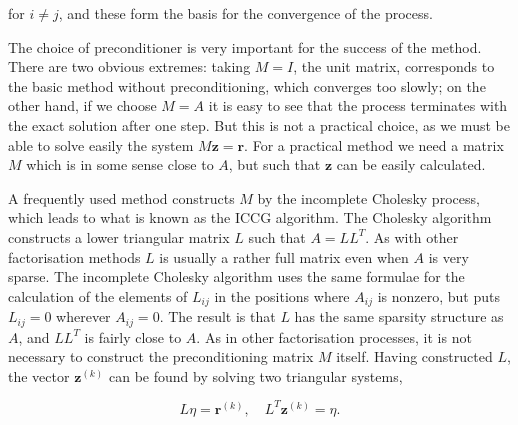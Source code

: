 \documentclass[10pt]{article}
\begin{document}
for \(i \neq j\), and these form the basis for the convergence of the process.

The choice of preconditioner is very important for the success of the method. There are two obvious extremes: taking \(M=I\), the unit matrix, corresponds to the basic method without preconditioning, which converges too slowly; on the other hand, if we choose \(M=A\) it is easy to see that the process terminates with the exact solution after one step. But this is not a practical choice, as we must be able to solve easily the system \(M \mathbf{z}=\mathbf{r}\). For a practical method we need a matrix \(M\) which is in some sense close to \(A\), but such that \(\mathbf{z}\) can be easily calculated.

A frequently used method constructs \(M\) by the incomplete Cholesky process, which leads to what is known as the ICCG algorithm. The Cholesky algorithm constructs a lower triangular matrix \(L\) such that \(A=L L^{T}\). As with other factorisation methods \(L\) is usually a rather full matrix even when \(A\) is very sparse. The incomplete Cholesky algorithm uses the same formulae for the calculation of the elements of \(L_{i j}\) in the positions where \(A_{i j}\) is nonzero, but puts \(L_{i j}=0\) wherever \(A_{i j}=0\). The result is that \(L\) has the same sparsity structure as \(A\), and \(L L^{T}\) is fairly close to \(A\). As in other factorisation processes, it is not necessary to construct the preconditioning matrix \(M\) itself. Having constructed \(L\), the vector \(\mathbf{z}^{(k)}\) can be found by solving two triangular systems,

\[
L \eta=\mathbf{r}^{(k)}, \quad L^{T} \mathbf{z}^{(k)}=\eta .
\]
\end{document}
